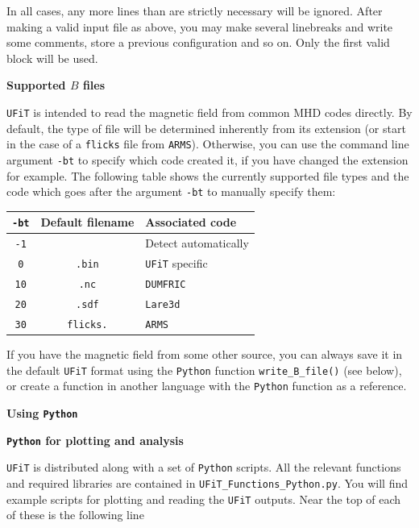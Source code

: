 \documentclass[12pt,twoside]{article}
\begin{document}
In all cases, any more lines than are strictly necessary will be ignored. After making a valid input file as above, you may make several linebreaks and write some comments, store a previous configuration and so on. Only the first valid block will be used.

\vspace{2mm}
{\Large \textbf{Supported $B$ files}}

\texttt{UFiT} is intended to read the magnetic field from common MHD codes directly. By default, the type of file will be determined inherently from its extension (or start in the case of a \texttt{flicks} file from \texttt{ARMS}). Otherwise, you can use the command line argument \texttt{-bt} to specify which code created it, if you have changed the extension for example. The following table shows the currently supported file types and the code which goes after the argument \texttt{-bt} to manually specify them:

\vspace{2mm}
\begin{tabular}{|c|c|l|}		
		\hline
		\texttt{-bt} & \textbf{Default filename} & \textbf{Associated code} \\\hline\hline
		\texttt{-1} &  & Detect automatically \\\hline
		\texttt{0}  &  \texttt{.bin} & \texttt{UFiT} specific \\\hline
		\texttt{10} & \texttt{.nc} & \texttt{DUMFRIC} \\\hline
		\texttt{20} & \texttt{.sdf} & \texttt{Lare3d} \\\hline
		\texttt{30} & \texttt{flicks.} & \texttt{ARMS} \\\hline
\end{tabular}
\vspace{2mm}

If you have the magnetic field from some other source, you can always save it in the default \texttt{UFiT} format using the \texttt{Python} function \texttt{write\_B\_file()} (see below), or create a function in another language with the \texttt{Python} function as a reference.


\vspace{2mm}
{\Large \textbf{Using \texttt{Python}}}

\vspace{2mm}
{\large \textbf{\texttt{Python} for plotting and analysis}}

\texttt{UFiT} is distributed along with a set of \texttt{Python} scripts. All the relevant functions and required libraries are contained in \texttt{UFiT\_Functions\_Python.py}. You will find example scripts for plotting and reading the \texttt{UFiT} outputs. Near the top of each of these is the following line
\end{document}
